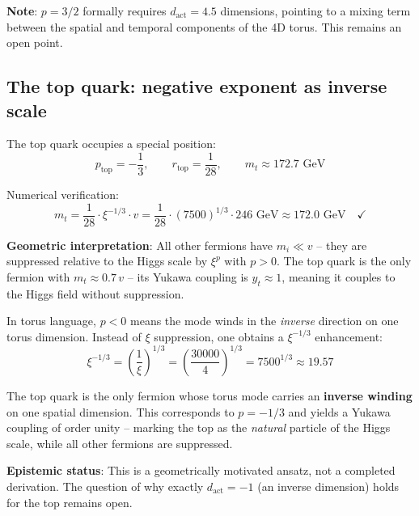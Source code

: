 \textbf{Note}: $p = 3/2$ formally requires $d_{\text{act}} = 4.5$
dimensions, pointing to a mixing term between the spatial and temporal
components of the 4D torus. This remains an open point.

\subsection{The top quark: negative exponent as inverse scale}

The top quark occupies a special position:
\begin{equation}
    p_{\text{top}} = -\frac{1}{3}, \qquad
    r_{\text{top}} = \frac{1}{28}, \qquad
    m_t \approx 172.7 \text{ GeV}
\end{equation}

Numerical verification:
\begin{equation}
    m_t = \frac{1}{28} \cdot \xi^{-1/3} \cdot v
    = \frac{1}{28} \cdot (7500)^{1/3} \cdot 246 \text{ GeV}
    \approx 172.0 \text{ GeV} \quad \checkmark
\end{equation}

\textbf{Geometric interpretation}: All other fermions have $m_i \ll v$
-- they are suppressed relative to the Higgs scale by $\xi^p$ with
$p > 0$. The top quark is the only fermion with $m_t \approx 0.7\,v$
-- its Yukawa coupling is $y_t \approx 1$, meaning it couples to the
Higgs field without suppression.

In torus language, $p < 0$ means the mode winds in the \emph{inverse}
direction on one torus dimension. Instead of $\xi$ suppression, one
obtains a $\xi^{-1/3}$ enhancement:
\begin{equation}
    \xi^{-1/3} = \left(\frac{1}{\xi}\right)^{1/3}
    = \left(\frac{30000}{4}\right)^{1/3}
    = 7500^{1/3} \approx 19.57
\end{equation}

\begin{predbox}
The top quark is the only fermion whose torus mode carries an
\textbf{inverse winding} on one spatial dimension. This corresponds
to $p = -1/3$ and yields a Yukawa coupling of order unity -- marking
the top as the \emph{natural} particle of the Higgs scale, while all
other fermions are suppressed.
\end{predbox}

\textbf{Epistemic status}: This is a geometrically motivated ansatz,
not a completed derivation. The question of why exactly
$d_{\text{act}} = -1$ (an inverse dimension) holds for the top
remains open.

